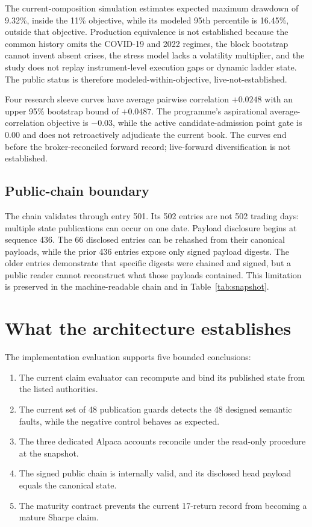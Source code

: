 \documentclass[11pt]{article}
\begin{document}
The current-composition simulation estimates expected maximum drawdown of 9.32\%, inside the 11\% objective, while its modeled 95th percentile is 16.45\%, outside that objective. Production equivalence is not established because the common history omits the COVID-19 and 2022 regimes, the block bootstrap cannot invent absent crises, the stress model lacks a volatility multiplier, and the study does not replay instrument-level execution gaps or dynamic ladder state. The public status is therefore modeled-within-objective, live-not-established.

Four research sleeve curves have average pairwise correlation $+0.0248$ with an upper 95\% bootstrap bound of $+0.0487$. The programme's aspirational average-correlation objective is $-0.03$, while the active candidate-admission point gate is 0.00 and does not retroactively adjudicate the current book. The curves end before the broker-reconciled forward record; live-forward diversification is not established.

\subsection{Public-chain boundary}

The chain validates through entry 501. Its 502 entries are not 502 trading days: multiple state publications can occur on one date. Payload disclosure begins at sequence 436. The 66 disclosed entries can be rehashed from their canonical payloads, while the prior 436 entries expose only signed payload digests. The older entries demonstrate that specific digests were chained and signed, but a public reader cannot reconstruct what those payloads contained. This limitation is preserved in the machine-readable chain and in Table~\ref{tab:snapshot}.

\section{What the architecture establishes}

The implementation evaluation supports five bounded conclusions:

\begin{enumerate}
  \item The current claim evaluator can recompute and bind its published state from the listed authorities.
  \item The current set of 48 publication guards detects the 48 designed semantic faults, while the negative control behaves as expected.
  \item The three dedicated Alpaca accounts reconcile under the read-only procedure at the snapshot.
  \item The signed public chain is internally valid, and its disclosed head payload equals the canonical state.
  \item The maturity contract prevents the current 17-return record from becoming a mature Sharpe claim.
\end{enumerate}
\end{document}
